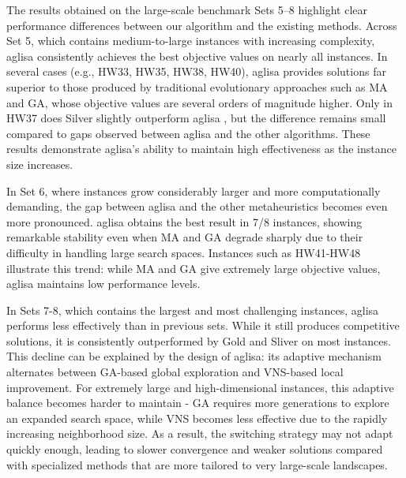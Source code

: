 \documentclass[]{interact}
\begin{document}
The results obtained on the large-scale benchmark Sets 5–8 highlight clear performance differences between our algorithm and the existing methods. 
Across Set 5, which contains medium-to-large instances with increasing complexity, \gls{aglisa} consistently achieves the best objective values on nearly all instances. In several cases (e.g., HW33, HW35, HW38, HW40), \gls{aglisa} provides solutions far superior to those produced by traditional evolutionary approaches such as MA and GA, whose objective values are several orders of magnitude higher. Only in HW37 does Silver slightly outperform \gls{aglisa} , but the difference remains small compared to gaps observed between \gls{aglisa} and the other algorithms. These results demonstrate \gls{aglisa}'s ability to maintain high effectiveness as the instance size increases.

In Set 6, where instances grow considerably larger and more computationally demanding, the gap between \gls{aglisa} and the other metaheuristics becomes even more pronounced. \gls{aglisa} obtains the best result in 7/8 instances, showing remarkable stability even when MA and GA degrade sharply due to their difficulty in handling large search spaces. Instances such as HW41-HW48 illustrate this trend: while MA and GA give extremely large objective values, \gls{aglisa} maintains low performance levels.

In Sets 7-8, which contains the largest and most challenging instances, \gls{aglisa} performs less effectively than in previous sets. While it still produces competitive solutions, it is consistently outperformed by Gold and Sliver on most instances. This decline can be explained by the design of \gls{aglisa}: its adaptive mechanism alternates between GA-based global exploration and VNS-based local improvement. For extremely large and high-dimensional instances, this adaptive balance becomes harder to maintain - GA requires more generations to explore an expanded search space, while VNS becomes less effective due to the rapidly increasing neighborhood size. As a result, the switching strategy may not adapt quickly enough, leading to slower convergence and weaker solutions compared with specialized methods that are more tailored to very large-scale landscapes.
\end{document}
